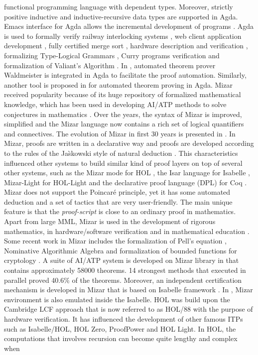 functional programming language with dependent types.
Moreover, strictly positive inductive and inductive-recursive data types are supported in Agda.
Emacs interface for Agda allows the incremental development of programs .
Agda is used to formally verify railway interlocking systems , web client application development ,
fully certified merge sort , hardware description and verification , 
formalizing Type-Logical Grammars , Curry programs verification  and formalization of Valiant's Algorithm .
In , automated theorem prover Waldmeister  is integrated in Agda to facilitate the proof automation. 
Similarly, another tool is proposed in  for automated theorem proving in Agda.
Mizar received popularity because of its huge repository of formalized mathematical knowledge, 
which has been used in developing AI/ATP methods to solve conjectures in mathematics . 
Over the years, the syntax of Mizar is improved, simplified and the Mizar language now contains
a rich set of logical quantifiers and connectives.
The evolution of Mizar in first 30 years is presented in . 
In Mizar, proofs are written in a declarative way and proofs are developed according to the rules of the Ja\`{s}kowski style of
natural deduction . This characteristics influenced other systems to build similar kind of proof
layers on top of several other systems, such as the Mizar mode for HOL , the Isar language for Isabelle , 
Mizar-Light for HOL-Light  and the declarative proof language (DPL) for Coq . 
Mizar does not support the Poincar{\'e} principle, yet it has some automated deduction and a set of tactics that are very user-friendly. 
The main unique feature is that the {\em proof-script} is close to an ordinary proof in mathematics.
Apart from large MML, Mizar is used in the development of rigorous mathematics, in hardware/software verification and in mathematical education .
Some recent work in Mizar includes the formalization of Pell's equation , Nominative Algorithmic Algebra 
and formalization of bounded functions for cryptology . 
A suite of AI/ATP system is developed on Mizar library in  that contains approximately 58000 theorems. 
14 strongest methods that executed in parallel proved 40.6\% of the theorems.
Moreover, an independent certification mechanism is developed in Mizar that is based on Isabelle framework . 
In , Mizar environment is also emulated inside the Isabelle.
HOL was build upon the Cambridge LCF approach  that is now referred to as HOL/88 with the purpose of hardware verification. It has influenced the 
development of other famous ITPs such as Isabelle/HOL,
HOL Zero, ProofPower and HOL Light. In HOL, the computations that involves recursion can become quite lengthy and complex when 
